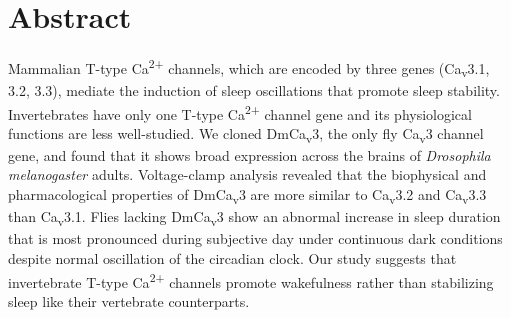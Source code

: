 \section*{Abstract}
Mammalian T-type Ca\textsuperscript{2+} channels, which are encoded by three genes (Ca\textsubscript{v}3.1, 3.2, 3.3), mediate the induction of sleep oscillations that promote sleep stability.
Invertebrates have only one T-type Ca\textsuperscript{2+} channel gene and its physiological functions are less well-studied.
We cloned DmCa\textsubscript{v}3, the only fly Ca\textsubscript{v}3 channel gene, and found that it shows broad expression across the brains of \emph{Drosophila melanogaster} adults.
Voltage-clamp analysis revealed that the biophysical and pharmacological properties of DmCa\textsubscript{v}3 are more similar to Ca\textsubscript{v}3.2 and Ca\textsubscript{v}3.3 than Ca\textsubscript{v}3.1.
Flies lacking DmCa\textsubscript{v}3 show an abnormal increase in sleep duration that is most pronounced during subjective day under continuous dark conditions despite normal oscillation of the circadian clock.
Our study suggests that invertebrate T-type Ca\textsuperscript{2+} channels promote wakefulness rather than stabilizing sleep like their vertebrate counterparts.